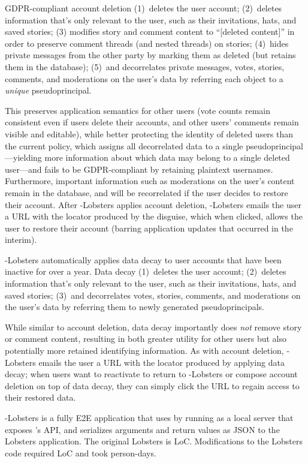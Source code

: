 GDPR-compliant account deletion 
%
(1)~deletes the user account;
%
(2)~deletes information that's only relevant to the user, such as their invitations, hats, and saved
stories;
%
(3) modifies story and comment content to ``[deleted content]'' in order to preserve comment threads
(and nested threads) on stories;
%
(4)~hides private messages from the other party by marking them as deleted (but retains them in the
database);
%
(5)~and decorrelates private messages, votes, stories, comments, and moderations on the user's data
by referring each object to a \emph{unique} pseudoprincipal.
%

This preserves application semantics for other users (\eg vote counts remain consistent even if
users delete their accounts, and other users' comments remain visible and editable), while better
protecting the identity of deleted users than the current policy, which assigns all decorrelated
data to a single pseudoprincipal---yielding more information about which data may belong to a single
deleted user---and fails to be GDPR-compliant by retaining plaintext usernames. Furthermore,
important information such as moderations on the user's content remain in the database, and will be
recorrelated if the user decides to restore their account.  After \sys-Lobsters applies account
deletion, \sys-Lobsters emails the user a URL with the locator produced by the disguise, which when
clicked, allows the user to restore their account (barring application updates that occurred in the
interim).

\sys-Lobsters automatically applies data decay to user accounts that have been inactive for over a year.
Data decay 
%
(1)~deletes the user account;
%
(2)~deletes information that's only relevant to the user, such as their invitations, hats, and saved
stories;
%
(3)~and decorrelates votes, stories, comments, and moderations on the user's data by referring them
to newly generated pseudoprincipals.
%

While similar to account deletion, data decay importantly does \emph{not} remove story or comment
content, resulting in both greater utility for other users but also potentially more retained
identifying information.  As with account deletion, \sys-Lobsters emails the user a URL with the locator
produced by applying data decay; when users want to reactivate to return to \sys-Lobsters or compose
account deletion on top of data decay, they can simply click the URL to regain access to their
restored data.

\sys-Lobsters is a fully E2E application that uses \sys by running \sys as a local
server that exposes \sys's API, and serializes arguments and return values as JSON to the Lobsters
application. 
The original Lobsters is LoC. 
Modifications to the Lobsters code required LoC and took  person-days.

